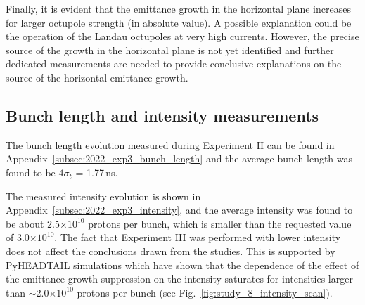 Finally, it is evident that the emittance growth in the horizontal plane increases for larger octupole strength (in absolute value). A possible explanation could be the operation of the Landau octupoles at very high currents. However, the precise source of the growth in the horizontal plane is not yet identified and further dedicated measurements are needed to provide conclusive explanations on the source of the horizontal emittance growth. 







\subsection{Bunch length and intensity measurements}\label{subsec:bunch_length_intensity_exp3}

The bunch length evolution measured during Experiment II can be found in Appendix~\ref{subsec:2022_exp3_bunch_length} and the average bunch length was found to be $4\sigma_t$ = 1.77\,ns.

The measured intensity evolution is shown in Appendix~\ref{subsec:2022_exp3_intensity}, and the average intensity was found to be about 2.5$\times 10^{10}$ protons per bunch, which is smaller than the requested value of 3.0$\times 10^{10}$. The fact that Experiment III was performed with lower intensity does not affect the conclusions drawn from the studies. This is supported by PyHEADTAIL simulations which have shown that the dependence of the effect of the emittance growth suppression on the intensity saturates for intensities larger than $\sim$2.0$\times 10^{10}$ protons per bunch (see Fig.~\ref{fig:study_8_intensity_scan}). %



